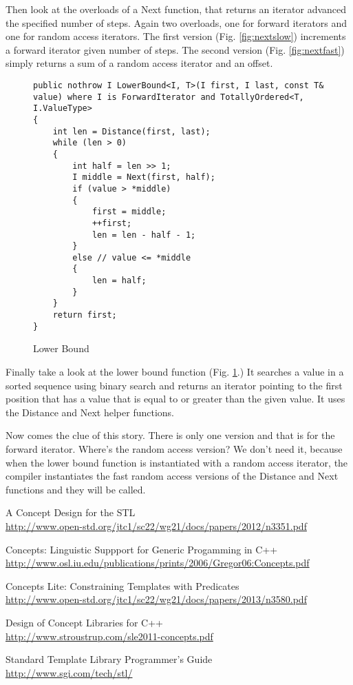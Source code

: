 \documentclass[oneside, a4paper, 11pt]{article}
\begin{document}
Then look at the overloads of a Next function, that
returns an iterator advanced the specified number of steps.
Again two overloads, one for forward iterators and one for random access
iterators.
The first version (Fig. \ref{fig:nextslow}) increments a forward iterator given
number of steps.
The second version (Fig. \ref{fig:nextfast}) simply returns a sum of a random access iterator
and an offset.

\clearpage
\begin{figure}[htb]\caption{Lower Bound}\label{fig:lowerbound}
\begin{lstlisting}[frame=trBL]
public nothrow I LowerBound<I, T>(I first, I last, const T& value) where I is ForwardIterator and TotallyOrdered<T, I.ValueType>
{
    int len = Distance(first, last);
    while (len > 0)
    {
        int half = len >> 1;
        I middle = Next(first, half);
        if (value > *middle)
        {
            first = middle;
            ++first;
            len = len - half - 1;
        }
        else // value <= *middle
        {
            len = half;
        }
    }
    return first;
}
\end{lstlisting}
\end{figure}

Finally take a look at the lower bound function (Fig. \ref{fig:lowerbound}.)
It searches a value in a sorted sequence using binary search and
returns an iterator pointing to the first position that has a value that is equal to or greater than the given value.
It uses the Distance and Next helper functions.

Now comes the clue of this story. There is only one version and that is for the forward iterator.
Where's the random access version?
We don't need it, because when the lower bound function is instantiated with a random access iterator, the
compiler instantiates the fast random access versions of the Distance and Next functions and they will be called.

\begin{thebibliography}{5}

A Concept Design for the STL\\
\url{http://www.open-std.org/jtc1/sc22/wg21/docs/papers/2012/n3351.pdf}

Concepts: Linguistic Suppport for Generic Progamming in C++\\
\url{http://www.osl.iu.edu/publications/prints/2006/Gregor06:Concepts.pdf}

Concepts Lite: Constraining Templates with Predicates\\
\url{http://www.open-std.org/jtc1/sc22/wg21/docs/papers/2013/n3580.pdf}

Design of Concept Libraries for C++\\
\url{http://www.stroustrup.com/sle2011-concepts.pdf}

Standard Template Library Programmer's Guide\\
\url{http://www.sgi.com/tech/stl/}

\end{thebibliography}
\end{document}
